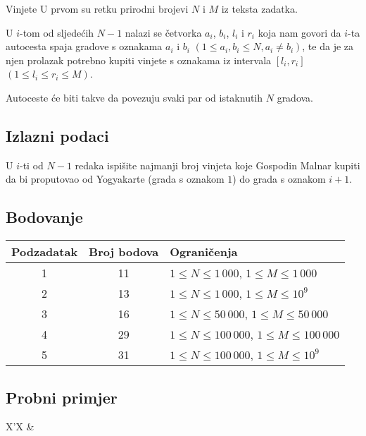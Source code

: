 \begin{statement}[
  problempoints=100,
  timelimit=1 sekunda,
  memorylimit=512 MiB,
]{Vinjete}
U prvom su retku prirodni brojevi $N$ i $M$ iz teksta zadatka.

U $i$-tom od sljedećih $N-1$ nalazi se četvorka $a_i$, $b_i$, $l_i$ i $r_i$
koja nam govori da $i$-ta autocesta spaja gradove s oznakama $a_i$ i $b_i$
$(1 \le a_i, b_i \le N, a_i \ne b_i)$, te da je za njen prolazak potrebno
kupiti vinjete s oznakama iz intervala $[l_i, r_i]$ $(1 \le l_i \le r_i \le
M)$.

Autoceste će biti takve da povezuju svaki par od istaknutih $N$ gradova.

\subsection*{Izlazni podaci}

U $i$-ti od $N - 1$ redaka ispišite najmanji broj vinjeta koje Gospodin Malnar
kupiti da bi proputovao od Yogyakarte (grada s oznakom $1$) do grada s
oznakom $i+1$.

\subsection*{Bodovanje}

{\renewcommand{\arraystretch}{1.4}
  \setlength{\tabcolsep}{6pt}
  \begin{tabular}{ccl}
   Podzadatak & Broj bodova & Ograničenja \\ \midrule
    1 & 11 & $1 \le N \le 1\,000$, $1 \le M \le 1\,000$ \\
    2 & 13 & $1 \le N \le 1\,000$, $1 \le M \le 10^9$ \\
    3 & 16 & $1 \le N \le 50\,000$, $1 \le M \le 50\,000$\\
    4 & 29 & $1 \le N \le 100\,000$, $1 \le M \le 100\,000$\\
    5 & 31 & $1 \le N \le 100\,000$, $1 \le M \le 10^9$
\end{tabular}}

\subsection*{Probni primjer}
\begin{tabularx}{\textwidth}{X'X}
 &
\end{tabularx}


\end{statement}
